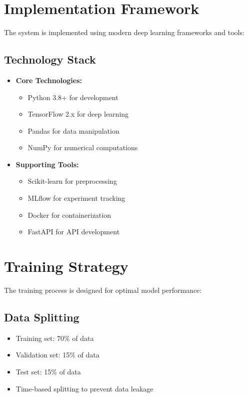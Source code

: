 \documentclass[12pt,a4paper]{report}
\begin{document}
\section{Implementation Framework}
The system is implemented using modern deep learning frameworks and tools:

\subsection{Technology Stack}
\begin{itemize}
\item \textbf{Core Technologies:}
  \begin{itemize}
    \item Python 3.8+ for development
    \item TensorFlow 2.x for deep learning
    \item Pandas for data manipulation
    \item NumPy for numerical computations
  \end{itemize}

\item \textbf{Supporting Tools:}
  \begin{itemize}
    \item Scikit-learn for preprocessing
    \item MLflow for experiment tracking
    \item Docker for containerization
    \item FastAPI for API development
  \end{itemize}
\end{itemize}

\section{Training Strategy}
The training process is designed for optimal model performance:

\subsection{Data Splitting}
\begin{itemize}
\item Training set: 70\% of data
\item Validation set: 15\% of data
\item Test set: 15\% of data
\item Time-based splitting to prevent data leakage
\end{itemize}
\end{document}
